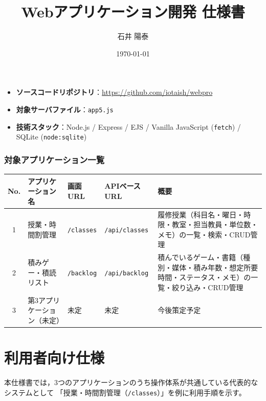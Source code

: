 \documentclass[
  a4paper,
  fontsize=11pt,
  line_length=40zw,
  number_of_lines=35,
  baselineskip=1.7zw
]{jlreq}
\title{Webアプリケーション開発 仕様書}
\author{石井 陽泰}
\date{\today}
\begin{document}
\maketitle

\begin{itemize}[leftmargin=1.5em]
  \item \textbf{ソースコードリポジトリ}：\url{https://github.com/iotaish/webpro}
  \item \textbf{対象サーバファイル}：\texttt{app5.js}
  \item \textbf{技術スタック}：Node.js / Express / EJS / Vanilla JavaScript (\texttt{fetch}) / SQLite (\texttt{node:sqlite})
\end{itemize}

\section*{対象アプリケーション一覧}

\begin{table}[htbp]
  \centering
  \small
  \begin{tabularx}{\textwidth}{clllX}
    \toprule
    No. & アプリケーション名 & 画面URL & APIベースURL & 概要 \\
    \midrule
    1 & 授業・時間割管理 & \texttt{/classes} & \texttt{/api/classes} &
      履修授業（科目名・曜日・時限・教室・担当教員・単位数・メモ）の一覧・検索・CRUD管理 \\
    2 & 積みゲー・積読リスト & \texttt{/backlog} & \texttt{/api/backlog} &
      積んでいるゲーム・書籍（種別・媒体・積み年数・想定所要時間・ステータス・メモ）の一覧・絞り込み・CRUD管理 \\
    3 & 第3アプリケーション（未定） & 未定 & 未定 & 今後策定予定 \\
    \bottomrule
  \end{tabularx}
\end{table}

\tableofcontents
\newpage

\part{利用者向け仕様}

本仕様書では，3つのアプリケーションのうち操作体系が共通している代表的なシステムとして
「授業・時間割管理（\texttt{/classes}）」を例に利用手順を示す。
\end{document}
